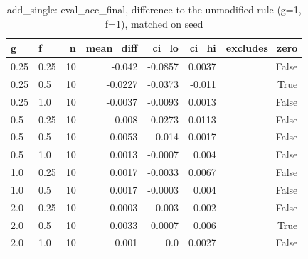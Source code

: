 \begin{table}[t]
\centering
\small
\begin{tabular}{llrrrrr}
\toprule
g & f & n & mean\_diff & ci\_lo & ci\_hi & excludes\_zero \\
\midrule
0.25 & 0.25 & 10 & -0.042 & -0.0857 & 0.0037 & False \\
0.25 & 0.5 & 10 & -0.0227 & -0.0373 & -0.011 & True \\
0.25 & 1.0 & 10 & -0.0037 & -0.0093 & 0.0013 & False \\
0.5 & 0.25 & 10 & -0.008 & -0.0273 & 0.0113 & False \\
0.5 & 0.5 & 10 & -0.0053 & -0.014 & 0.0017 & False \\
0.5 & 1.0 & 10 & 0.0013 & -0.0007 & 0.004 & False \\
1.0 & 0.25 & 10 & 0.0017 & -0.0033 & 0.0067 & False \\
1.0 & 0.5 & 10 & 0.0017 & -0.0003 & 0.004 & False \\
2.0 & 0.25 & 10 & -0.0003 & -0.003 & 0.002 & False \\
2.0 & 0.5 & 10 & 0.0033 & 0.0007 & 0.006 & True \\
2.0 & 1.0 & 10 & 0.001 & 0.0 & 0.0027 & False \\
\bottomrule
\end{tabular}
\caption{add\_single: eval\_acc\_final, difference to the unmodified rule (g=1, f=1), matched on seed}
\label{tab:plasticity_add_single_eval_acc_final_paired}
\end{table}